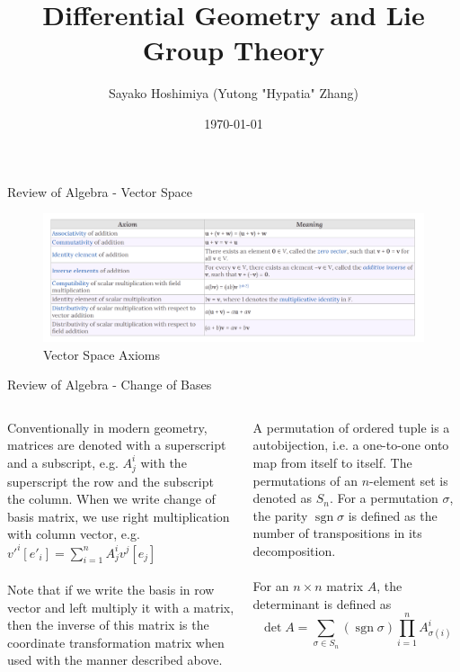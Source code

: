 \documentclass[aspectratio=169]{beamer}
\title{Differential Geometry and Lie Group Theory}
\date{\today}
\author{Sayako Hoshimiya (Yutong "Hypatia" Zhang)}
\institute{Beijing LGBT Center}
\begin{document}
\maketitle
\begin{frame}{Review of Algebra - Vector Space}
\vspace{.5cm}
\begin{figure}[]
\centering
\includegraphics[width=\textwidth]{vectorspaceaxioms}
\caption{Vector Space Axioms}
\end{figure}
\end{frame}
\begin{frame}{Review of Algebra - Change of Bases}
\begin{columns}
\begin{column}{0.5\textwidth}
Conventionally in modern geometry, \alert{matrices} are denoted with a superscript and a subscript, e.g. $A^i_j$ with the superscript the row and the subscript the column. When we write change of basis matrix, we use right multiplication with column vector, e.g. ${v'}^i[e'_i]=\sum_{i=1}^nA^i_jv^j[e_j]$
\\~\\
Note that if we write the basis in row vector and left multiply it with a matrix, then the inverse of this matrix is the coordinate transformation matrix when used with the manner described above.
\end{column}
\begin{column}{0.5\textwidth}
A \alert{permutation} of ordered tuple is a autobijection, i.e. a one-to-one onto map from itself to itself. The permutations of an $n$-element set is denoted as $S_n$. For a permutation $\sigma$, the \alert{parity} $\operatorname{sgn}\sigma$ is defined as the number of transpositions in its decomposition.
\\~\\
For an $n\times n$ matrix $A$, the determinant is defined as $$\det A=\sum_{\sigma\in S_n}(\operatorname{sgn}\sigma)\prod_{i=1}^nA^i_{\sigma(i)}$$
\end{column}
\end{columns}
\end{frame}
\end{document}
